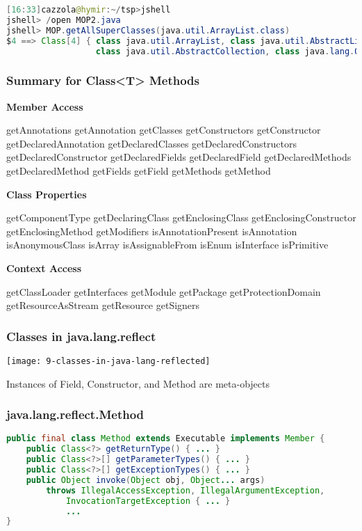 \begin{lstlisting}[language=Java]
[16:33]cazzola@hymir:~/tsp>jshell
jshell> /open MOP2.java
jshell> MOP.getAllSuperClasses(java.util.ArrayList.class)
$4 ==> Class[4] { class java.util.ArrayList, class java.util.AbstractList,
                  class java.util.AbstractCollection, class java.lang.Object }
\end{lstlisting}

\subsubsection{Summary for Class<T> Methods}

\textbf{Member Access}

getAnnotations
getAnnotation
getClasses
getConstructors
getConstructor
getDeclaredAnnotation
getDeclaredClasses
getDeclaredConstructors
getDeclaredConstructor
getDeclaredFields
getDeclaredField
getDeclaredMethods
getDeclaredMethod
getFields
getField
getMethods
getMethod

\textbf{Class Properties}

getComponentType
getDeclaringClass
getEnclosingClass
getEnclosingConstructor
getEnclosingMethod
getModifiers
isAnnotationPresent
isAnnotation
isAnonymousClass
isArray
isAssignableFrom
isEnum
isInterface
isPrimitive

\textbf{Context Access}

getClassLoader
getInterfaces
getModule
getPackage
getProtectionDomain
getResourceAsStream
getResource
getSigners

\subsubsection{Classes in java.lang.reflect}

\begin{center}
\texttt{[image: 9-classes-in-java-lang-reflected]}
\end{center}

Instances of Field, Constructor, and Method are meta-objects

\subsubsection{java.lang.reflect.Method}

\begin{lstlisting}[language=Java]
public final class Method extends Executable implements Member {
	public Class<?> getReturnType() { ... }
	public Class<?>[] getParameterTypes() { ... }
	public Class<?>[] getExceptionTypes() { ... }
	public Object invoke(Object obj, Object... args)
		throws IllegalAccessException, IllegalArgumentException,
			InvocationTargetException { ... }
			...
}
\end{lstlisting}

